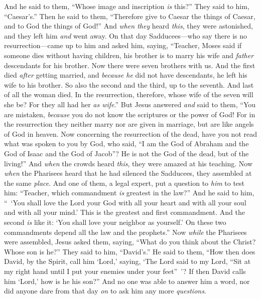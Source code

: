 \begin{biblechapter}
\verse And he said to them, “Whose image and inscription \textit{is} this?”
\verse They said to him, “Caesar’s.” Then he said to them, “Therefore give to Caesar the things of Caesar, and to God the things of God!”
\verse And \textit{when they} heard \textit{this}, they were astonished, and they left him \textit{and} went away.
 On that day Sadducees—who say there is no resurrection—came up to him and asked him,
\verse saying, “Teacher, Moses said if someone dies without having children, his brother is to marry his wife and \textit{father} descendants for his brother.
\verse Now there were seven brothers with us. And the first died \textit{after} getting married, and \textit{because he} did not have descendants, he left his wife to his brother.
\verse So also the second and the third, up to the seventh.
\verse And last of all the woman died.
\verse In the resurrection, therefore, whose wife of the seven will she be? For they all had her \textit{as wife}.”
\verse But Jesus answered \textit{and} said to them, “You are mistaken, \textit{because} you do not know the scriptures or the power of God!
\verse For in the resurrection they neither marry nor are given in marriage, but are like angels of God in heaven.
\verse Now concerning the resurrection of the dead, have you not read what was spoken to you by God, who said,
\verse “I am the God of Abraham and the God of Isaac and the God of Jacob”? He is not the God of the dead, but of the living!”
\verse And \textit{when} the crowds heard \textit{this}, they were amazed at his teaching.
 Now \textit{when} the Pharisees heard that he had silenced the Sadducees, they assembled at the same \textit{place}.
\verse And one of them, a legal expert, put a question to \textit{him} to test him:
\verse “Teacher, which commandment \textit{is} greatest in the law?”
\verse And he said to him, “ ‘You shall love the Lord your God with all your heart and with all your soul and with all your mind.’
\verse This is the greatest and first commandment.
\verse And the second \textit{is} like it: ‘You shall love your neighbor as yourself.’
\verse On these two commandments depend all the law and the prophets.”
 Now \textit{while} the Pharisees were assembled, Jesus asked them,
\verse saying, “What do you think about the Christ? Whose son is he?” They said to him, “David’s.”
\verse He said to them, “How then does David, by the Spirit, call him ‘Lord,’ saying,
\verse ‘The Lord said to my Lord, 
“Sit at my right hand 
until I put your enemies 
under your feet” ’?
\verse If then David calls him ‘Lord,’ how is he his son?”
\verse And no one was able to answer him a word, nor did anyone dare from that day \textit{on} to ask him any more \textit{questions}.
\end{biblechapter}

